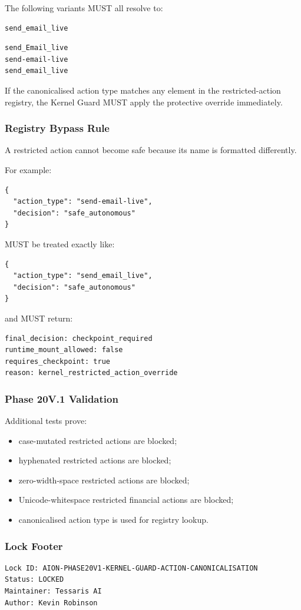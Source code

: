 The following variants MUST all resolve to:

\begin{verbatim}
send_email_live
\end{verbatim}

\begin{verbatim}
send_Email_live
send-email-live
send_​email_live
\end{verbatim}

If the canonicalised action type matches any element in the restricted-action registry, the Kernel Guard MUST apply the protective override immediately.

\subsubsection{Registry Bypass Rule}

A restricted action cannot become safe because its name is formatted differently.

For example:

\begin{verbatim}
{
  "action_type": "send-email-live",
  "decision": "safe_autonomous"
}
\end{verbatim}

MUST be treated exactly like:

\begin{verbatim}
{
  "action_type": "send_email_live",
  "decision": "safe_autonomous"
}
\end{verbatim}

and MUST return:

\begin{verbatim}
final_decision: checkpoint_required
runtime_mount_allowed: false
requires_checkpoint: true
reason: kernel_restricted_action_override
\end{verbatim}

\subsubsection{Phase 20V.1 Validation}

Additional tests prove:

\begin{itemize}
  \item case-mutated restricted actions are blocked;
  \item hyphenated restricted actions are blocked;
  \item zero-width-space restricted actions are blocked;
  \item Unicode-whitespace restricted financial actions are blocked;
  \item canonicalised action type is used for registry lookup.
\end{itemize}

\subsubsection{Lock Footer}

\begin{verbatim}
Lock ID: AION-PHASE20V1-KERNEL-GUARD-ACTION-CANONICALISATION
Status: LOCKED
Maintainer: Tessaris AI
Author: Kevin Robinson
\end{verbatim}
